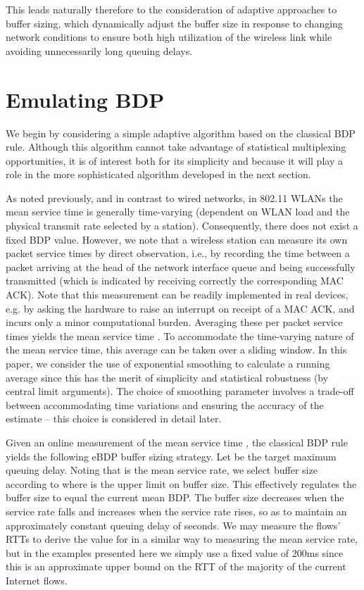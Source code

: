 \documentclass[10pt,twocolumn, journal]{IEEEtran}
\begin{document}
This leads naturally therefore to the consideration of adaptive approaches to buffer sizing, which dynamically adjust the buffer size in response to changing network conditions to ensure both high utilization of the wireless link while avoiding unnecessarily long queuing delays.

\section{Emulating BDP}\label{sec_eBDP}

We begin by considering a simple adaptive algorithm based on the classical BDP rule.   Although this algorithm cannot take advantage of statistical multiplexing opportunities, it is of interest both for its simplicity and because it will play a role in the more sophisticated  algorithm developed in the next section.

As noted previously, and in contrast to wired networks,  in 802.11 WLANs the mean service time is generally time-varying (dependent on WLAN load and the physical transmit rate selected by a station). Consequently, there does not exist a fixed BDP value.   However, we note that a wireless station can measure its own packet service times by direct observation, i.e., by recording the time between a packet arriving at the head of the network interface queue  and being successfully transmitted  (which is indicated by receiving correctly the corresponding MAC ACK).  Note that this measurement can be readily implemented in real devices, e.g. by asking the hardware to raise an interrupt on receipt of a MAC ACK, and incurs only a minor computational burden.    Averaging these per packet service times yields the mean service time .   To accommodate the time-varying nature of the mean service time, this average can be taken over a sliding window.  In this paper, we consider the use of exponential smoothing  to calculate a running average since this has the merit of simplicity and statistical robustness (by central limit arguments).  The choice of smoothing parameter  involves a trade-off between accommodating time variations and ensuring the accuracy of the estimate -- this choice is considered in detail later.

Given an online measurement of the mean service time , the classical BDP rule yields the following eBDP buffer sizing strategy. Let  be the target maximum queuing delay. Noting that  is the mean service rate, we select buffer size  according to
 where  is the upper limit
on buffer size. This effectively regulates the buffer size to equal the current mean BDP.
The buffer size decreases when the service rate falls and increases when the service rate
rises, so as to maintain an approximately constant queuing delay of  seconds.
We may measure the flows' RTTs to derive the value for  in a similar way to measuring the mean service rate, but in the examples presented here we simply use a fixed value of 200ms since this is an approximate upper bound on the RTT of the majority of the current Internet flows.
\end{document}
